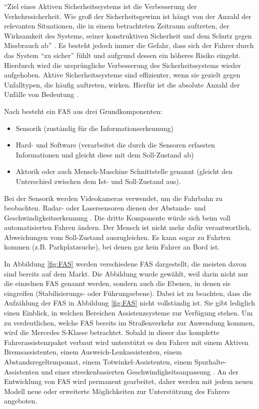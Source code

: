 \enquote{Ziel eines Aktiven Sicherheitssystems ist die Verbesserung der Verkehrssicherheit. Wie groß der Sicherheitsgewinn ist hängt von der Anzahl der relevanten Situationen, die in einem betrachteten Zeitraum auftreten, der Wirksamkeit des Systems, seiner konstruktiven Sicherheit und dem Schutz gegen Missbrauch ab} \parencite[S. 10]{Meitinger.2008}. Es besteht jedoch immer die Gefahr, dass sich der Fahrer durch das System \enquote{zu sicher} fühlt und aufgrund dessen ein höheres Risiko eingeht. Hierdurch wird die ursprüngliche Verbesserung des Sicherheitssystems wieder aufgehoben. Aktive Sicherheitssysteme sind effizienter, wenn sie gezielt gegen Unfalltypen, die häufig auftreten, wirken. Hierfür ist die absolute Anzahl der Unfälle von Bedeutung \parencite[S. 19]{Meitinger.2008}.

Nach \Textcite[S. 10]{Blakaj.14.09.2016} besteht ein \ac{FAS} aus drei Grundkomponenten:

\begin{itemize}
	\item Sensorik (zuständig für die Informationserkennung)
	\item Hard- und Software (verarbeitet die durch die Sensoren erfassten Informationen und gleicht diese mit dem Soll-Zustand ab)
	\item Aktorik oder auch Mensch-Maschine Schnittstelle genannt (gleicht den Unterschied zwischen dem Ist- und Soll-Zustand aus).
\end{itemize}

Bei der Sensorik werden Videokameras verwendet, um die Fahrbahn zu beobachten. Radar- oder Lasersensoren dienen der Abstands- und Geschwindigkeitserkennung \parencite[S. 4f]{Schmidt.2010}. Die dritte Komponente würde sich beim voll automatisierten Fahren ändern. Der Mensch ist nicht mehr dafür verantwortlich, Abweichungen vom Soll-Zustand auszugleichen. Es kann sogar zu Fahrten kommen (z.B. Parkplatzsuche), bei denen gar kein Fahrer an Bord ist.

In Abbildung \ref{fig:FAS} werden verschiedene \ac{FAS} dargestellt, die meisten davon sind bereits auf dem Markt. Die Abbildung wurde gewählt, weil darin nicht nur die einzelnen \ac{FAS} genannt werden, sondern auch die Ebenen, in denen sie eingreifen (Stabilisierungs- oder Führungsebene). Dabei ist zu beachten, dass die Aufzählung der \ac{FAS} in Abbildung \ref{fig:FAS} nicht vollständig ist. Sie gibt lediglich einen Einblick, in welchen Bereichen Assistenzsysteme zur Verfügung stehen. Um zu verdeutlichen, welche \ac{FAS} bereits im Straßenverkehr zur Anwendung kommen, wird die Mercedes S-Klasse betrachtet. Sobald in dieser das komplette Fahrerassistenzpaket verbaut wird unterstützt es den Fahrer mit einem Aktiven Bremsassistenten, einem Ausweich-Lenkassistenten, einem Abstandsregeltempomat, einem Totwinkel-Assistenten, einem Spurhalte-Assistenten und einer streckenbasierten Geschwindigkeitsanpassung \parencite{Anker.2017}. An der Entwicklung von \ac{FAS} wird permanent gearbeitet, daher werden mit jedem neuen  Modell neue oder erweiterte Möglichkeiten zur Unterstützung des Fahrers angeboten.

